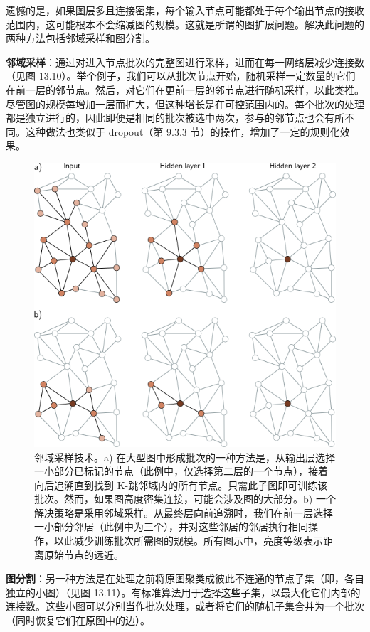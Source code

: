遗憾的是，如果图层多且连接密集，每个输入节点可能都处于每个输出节点的接收范围内，这可能根本不会缩减图的规模。这就是所谓的图扩展问题。解决此问题的两种方法包括邻域采样和图分割。

\textbf{邻域采样}：通过对进入节点批次的完整图进行采样，进而在每一网络层减少连接数（见图 13.10）。举个例子，我们可以从批次节点开始，随机采样一定数量的它们在前一层的邻节点。然后，对它们在更前一层的邻节点进行随机采样，以此类推。尽管图的规模每增加一层而扩大，但这种增长是在可控范围内的。每个批次的处理都是独立进行的，因此即便是相同的批次被选中两次，参与的邻节点也会有所不同。这种做法也类似于 dropout（第 9.3.3 节）的操作，增加了一定的规则化效果。

\begin{figure}[ht!]
\centering
\includegraphics[width=0.7\linewidth]{png/chapter13/GraphSampling.png}
\caption{邻域采样技术。a) 在大型图中形成批次的一种方法是，从输出层选择一小部分已标记的节点（此例中，仅选择第二层的一个节点），接着向后追溯直到找到 K-跳邻域内的所有节点。只需此子图即可训练该批次。然而，如果图高度密集连接，可能会涉及图的大部分。b) 一个解决策略是采用邻域采样。从最终层向前追溯时，我们在前一层选择一小部分邻居（此例中为三个），并对这些邻居的邻居执行相同操作，以此减少训练批次所需图的规模。所有图示中，亮度等级表示距离原始节点的远近。}
\end{figure}


\textbf{图分割}：另一种方法是在处理之前将原图聚类成彼此不连通的节点子集（即，各自独立的小图）（见图 13.11）。有标准算法用于选择这些子集，以最大化它们内部的连接数。这些小图可以分别当作批次处理，或者将它们的随机子集合并为一个批次（同时恢复它们在原图中的边）。

